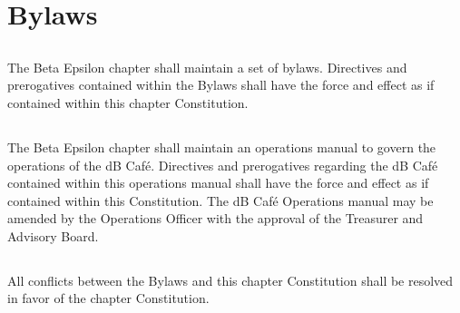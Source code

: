 \chapter{Bylaws}\label{sec:bylaws}

\section{}
The Beta Epsilon chapter shall maintain a set of bylaws. Directives and prerogatives contained within the Bylaws shall have the force and effect as if contained within this chapter Constitution.

\section{}
The Beta Epsilon chapter shall maintain an operations manual to govern the operations of the dB Caf\'{e}. Directives and prerogatives regarding the dB Caf\'{e} contained within this operations manual shall have the force and effect as if contained within this Constitution. The dB Caf\'{e} Operations manual may be amended by the Operations Officer with the approval of the Treasurer and Advisory Board.

\section{}
All conflicts between the Bylaws and this chapter Constitution shall be resolved in favor of the chapter Constitution.


